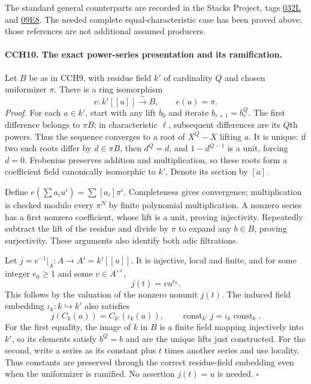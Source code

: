 The standard general counterparts are recorded in the Stacks
Project, tags \href{https://stacks.math.columbia.edu/tag/032L}{032L}
and \href{https://stacks.math.columbia.edu/tag/09E8}{09E8}.
The needed complete equal-characteristic case has been proved
above; those references are not additional assumed producers.

\paragraph{CCH10. The exact power-series presentation and its ramification.}
\label{claim:CCH10}
Let $B$ be as in CCH9, with residue field $k'$ of cardinality
$Q$ and chosen uniformizer $\pi$.  There is a ring isomorphism
\[
                         e:k'[[u]]\xrightarrow{\ \sim\ }B,
                  \qquad e(u)=\pi.                    \tag{CCH.20}
\]
\emph{Proof.}
For each $a\in k'$, start with any lift $b_0$ and iterate
$b_{r+1}=b_r^Q$.  The first difference belongs to $\pi B$;
in characteristic $\ell$, subsequent differences are its
$Q$th powers.  Thus the sequence converges to a root of
$X^Q-X$ lifting $a$.  It is unique: if two such roots differ
by $d\in\pi B$, then $d^Q=d$, and $1-d^{Q-1}$ is a unit,
forcing $d=0$.  Frobenius preserves addition and multiplication,
so these roots form a coefficient field canonically isomorphic
to $k'$.  Denote its section by $[a]$.

Define $e(\sum a_iu^i)=\sum[a_i]\pi^i$.
Completeness gives convergence; multiplication is checked
modulo every $\pi^N$ by finite polynomial multiplication.
A nonzero series has a first nonzero coefficient, whose lift
is a unit, proving injectivity.  Repeatedly subtract the lift
of the residue and divide by $\pi$ to expand any $b\in B$,
proving surjectivity.  These arguments also identify both
adic filtrations.

Let $j=e^{-1}|_A:A\to A'=k'[[u]]$.
It is injective, local and finite, and for some integer
$e_0\ge1$ and some $v\in A'^\times$,
\[
                         j(t)=v u^{e_0}.               \tag{CCH.21}
\]
This follows by the valuation of the nonzero nonunit $j(t)$.
The induced field embedding $\iota_k:k\hookrightarrow k'$
also satisfies
\[
 j(C_k(a))=C_{k'}(\iota_k(a)),\qquad
 \operatorname{const}_{k'}j
          =\iota_k\operatorname{const}_k.              \tag{CCH.22}
\]
For the first equality, the image of $k$ in $B$ is a finite
field mapping injectively into $k'$, so its elements satisfy
$b^Q=b$ and are the unique lifts just constructed.
For the second, write a series as its constant plus $t$ times
another series and use locality.  Thus constants are preserved
through the correct residue-field embedding even when the
uniformizer is ramified.  No assertion $j(t)=u$ is needed.
\hfill$\square$

